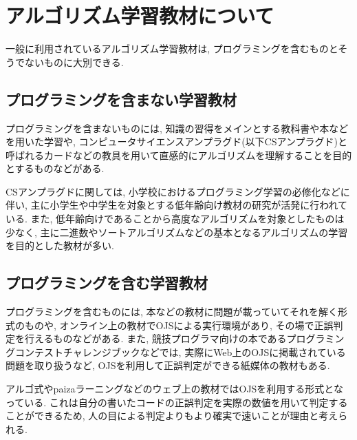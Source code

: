 \section{アルゴリズム学習教材について}

一般に利用されているアルゴリズム学習教材は, プログラミングを含むものとそうでないものに大別できる. 

\subsection{プログラミングを含まない学習教材}

プログラミングを含まないものには, 知識の習得をメインとする教科書や本などを用いた学習や, コンピュータサイエンスアンプラグド(以下CSアンプラグド)と呼ばれるカードなどの教具を用いて直感的にアルゴリズムを理解することを目的とするものなどがある. 

CSアンプラグドに関しては, 小学校におけるプログラミング学習の必修化などに伴い, 主に小学生や中学生を対象とする低年齢向け教材の研究が活発に行われている. 
また, 低年齢向けであることから高度なアルゴリズムを対象としたものは少なく, 主に二進数やソートアルゴリズムなどの基本となるアルゴリズムの学習を目的とした教材が多い. 

\subsection{プログラミングを含む学習教材}

プログラミングを含むものには, 本などの教材に問題が載っていてそれを解く形式のものや, オンライン上の教材でOJSによる実行環境があり, その場で正誤判定を行えるものなどがある. 
また, 競技プログラマ向けの本であるプログラミングコンテストチャレンジブック\cite{procon challenge}などでは, 実際にWeb上のOJSに掲載されている問題を取り扱うなど, OJSを利用して正誤判定ができる紙媒体の教材もある. 

アルゴ式\cite{algo-method}やpaizaラーニング\cite{paiza}などのウェブ上の教材ではOJSを利用する形式となっている. これは自分の書いたコードの正誤判定を実際の数値を用いて判定することができるため, 人の目による判定よりもより確実で速いことが理由と考えられる. 

